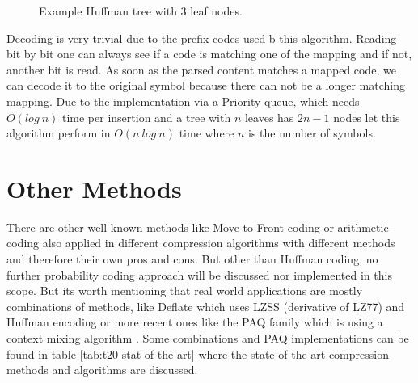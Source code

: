 {\begin{figure}[h]
	\centering
{}
	\caption{Example Huffman tree with 3 leaf nodes.} \label{fig:M1:example Huffman tree}
\end{figure}
}
\par{
Decoding is very trivial due to the prefix codes used b this algorithm. Reading bit by bit one can always see if a code is matching one of the mapping and if not, another bit is read. As soon as the parsed content matches a mapped code, we can decode it to the original symbol because there can not be a longer matching mapping. Due to the implementation via a Priority queue, which needs $O(log \: n)$ time per insertion and a tree with $n$ leaves has $2n-1$ nodes let this algorithm perform in $O(n \: log \: n)$ time where $n$ is the number of symbols.
}

\section{Other Methods}
\label{ch:Principles of compression:sec:Other}
\par{
There are other well known methods like Move-to-Front coding or arithmetic coding also applied in different compression algorithms with different methods and therefore their own pros and cons. But other than Huffman coding, no further probability coding approach will be discussed nor implemented in this scope. But its worth mentioning that real world applications are mostly combinations of methods, like Deflate\cite{deutsch1996rfc1951} which uses LZSS\cite{10.1145/322344.322346} (derivative of LZ77) and Huffman encoding or more recent ones like the PAQ family which is using a context mixing algorithm \cite{mahoney2009data}. Some combinations and PAQ implementations can be found in table \ref{tab:t20 stat of the art} where the state of the art compression methods and algorithms are discussed.
}

